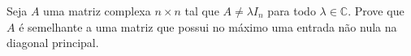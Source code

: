 Seja \(A\) uma matriz complexa \(n \times n\) tal que \(A \ne \lambda I_{n}\) para todo \(\lambda \in \mathbb{C}\). Prove que \(A\) é semelhante a uma matriz que possui no máximo uma entrada não nula na diagonal principal.
